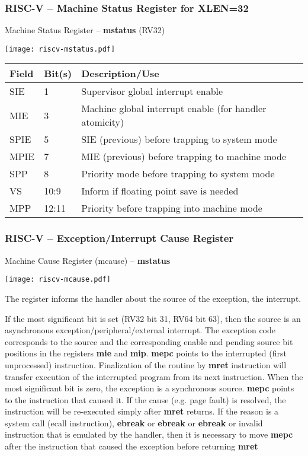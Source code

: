 \documentclass{beamer}
\begin{document}
\begin{frame}
\frametitle{RISC-V -- Machine Status Register for XLEN=32}

Machine Status Register -- \textbf{mstatus} (RV32)

\begin{center}
  \texttt{[image: riscv-mstatus.pdf]}
\end{center}

\begin{tabular}{|l|l|l|}  \hline
Field & Bit(s) & Description/Use \\\hline
SIE & 1 & Supervisor global interrupt enable \\\hline
MIE & 3 & Machine global interrupt enable (for handler atomicity) \\\hline
SPIE & 5 & SIE (previous) before trapping to system mode \\\hline
MPIE & 7 & MIE (previous) before trapping to machine mode \\\hline
SPP & 8 & Priority mode before trapping to system mode \\\hline
VS & 10:9 & Inform if floating point save is needed \\\hline
MPP & 12:11 & Priority before trapping into machine mode \\\hline
\end{tabular}
\end{frame}

\begin{frame}
\frametitle{RISC-V -- Exception/Interrupt Cause Register}

Machine Cause Register (mcause) -- \textbf{mstatus}

\begin{center}
  \texttt{[image: riscv-mcause.pdf]}
\end{center}

\small
The register informs the handler about the source of the exception, the interrupt.

If the most significant bit is set (RV32 bit 31, RV64 bit 63), then the source is an asynchronous exception/peripheral/external interrupt. The exception code corresponds to the source and the corresponding enable and pending source bit positions in the registers \textbf{mie} and \textbf{mip}. \textbf{mepc} points to the interrupted (first unprocessed) instruction. Finalization of the routine by \textbf{mret} instruction will transfer execution of the interrupted program from its next instruction. When the most significant bit is zero, the exception is a synchronous source. \textbf{mepc} points to the instruction that caused it. If the cause (e.g. page fault) is resolved, the instruction will be re-executed simply after \textbf{mret} returns. If the reason is a system call (ecall instruction), \textbf{ebreak} or \textbf{ebreak} or \textbf{ebreak} or invalid instruction that is emulated by the handler, then it is necessary to move \textbf{mepc} after the instruction that caused the exception before returning \textbf{mret}

\end{frame}
\end{document}
